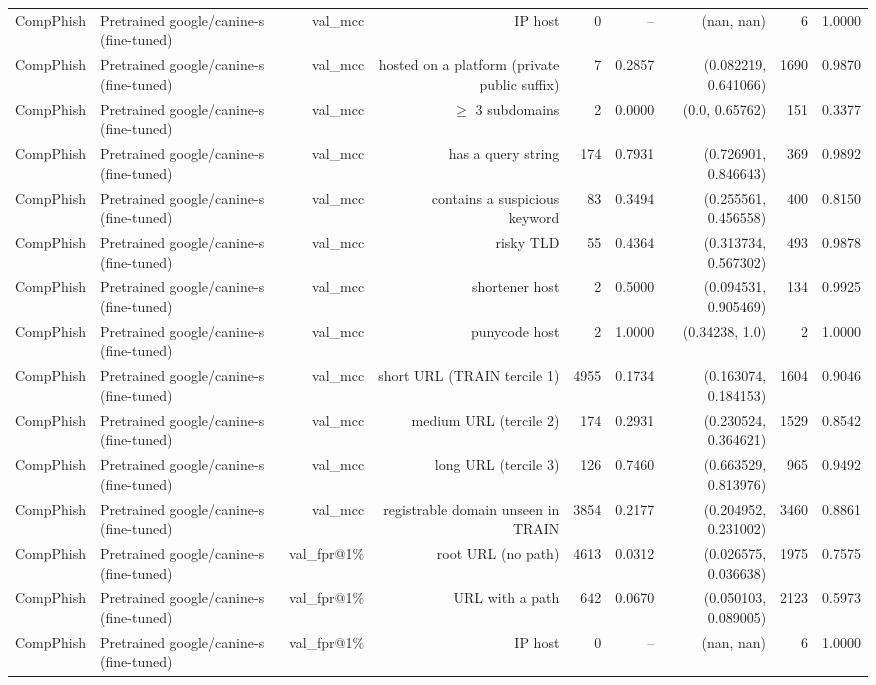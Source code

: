 \begin{table}[t]
\begin{tabular}{llrrrrrrr}
CompPhish & Pretrained google/canine-s (fine-tuned) & val\_mcc & IP host & 0 & -- & (nan, nan) & 6 & 1.0000 \\
CompPhish & Pretrained google/canine-s (fine-tuned) & val\_mcc & hosted on a platform (private public suffix) & 7 & 0.2857 & (0.082219, 0.641066) & 1690 & 0.9870 \\
CompPhish & Pretrained google/canine-s (fine-tuned) & val\_mcc & $\geq$ 3 subdomains & 2 & 0.0000 & (0.0, 0.65762) & 151 & 0.3377 \\
CompPhish & Pretrained google/canine-s (fine-tuned) & val\_mcc & has a query string & 174 & 0.7931 & (0.726901, 0.846643) & 369 & 0.9892 \\
CompPhish & Pretrained google/canine-s (fine-tuned) & val\_mcc & contains a suspicious keyword & 83 & 0.3494 & (0.255561, 0.456558) & 400 & 0.8150 \\
CompPhish & Pretrained google/canine-s (fine-tuned) & val\_mcc & risky TLD & 55 & 0.4364 & (0.313734, 0.567302) & 493 & 0.9878 \\
CompPhish & Pretrained google/canine-s (fine-tuned) & val\_mcc & shortener host & 2 & 0.5000 & (0.094531, 0.905469) & 134 & 0.9925 \\
CompPhish & Pretrained google/canine-s (fine-tuned) & val\_mcc & punycode host & 2 & 1.0000 & (0.34238, 1.0) & 2 & 1.0000 \\
CompPhish & Pretrained google/canine-s (fine-tuned) & val\_mcc & short URL (TRAIN tercile 1) & 4955 & 0.1734 & (0.163074, 0.184153) & 1604 & 0.9046 \\
CompPhish & Pretrained google/canine-s (fine-tuned) & val\_mcc & medium URL (tercile 2) & 174 & 0.2931 & (0.230524, 0.364621) & 1529 & 0.8542 \\
CompPhish & Pretrained google/canine-s (fine-tuned) & val\_mcc & long URL (tercile 3) & 126 & 0.7460 & (0.663529, 0.813976) & 965 & 0.9492 \\
CompPhish & Pretrained google/canine-s (fine-tuned) & val\_mcc & registrable domain unseen in TRAIN & 3854 & 0.2177 & (0.204952, 0.231002) & 3460 & 0.8861 \\
CompPhish & Pretrained google/canine-s (fine-tuned) & val\_fpr@1\% & root URL (no path) & 4613 & 0.0312 & (0.026575, 0.036638) & 1975 & 0.7575 \\
CompPhish & Pretrained google/canine-s (fine-tuned) & val\_fpr@1\% & URL with a path & 642 & 0.0670 & (0.050103, 0.089005) & 2123 & 0.5973 \\
CompPhish & Pretrained google/canine-s (fine-tuned) & val\_fpr@1\% & IP host & 0 & -- & (nan, nan) & 6 & 1.0000 \\

\end{tabular}
\end{table}
